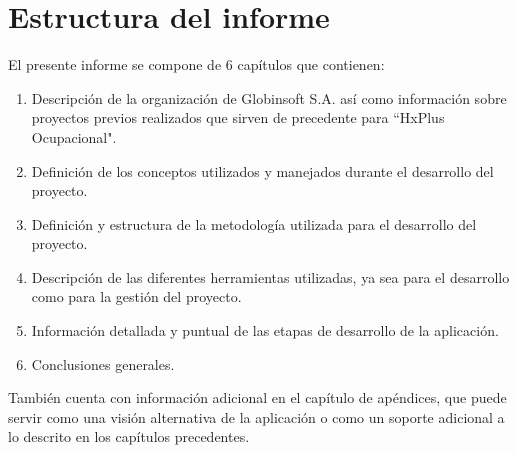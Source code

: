 \section*{Estructura del informe}

El presente informe se compone de 6 capítulos que contienen:

\begin{enumerate}
    \item Descripción de la organización de Globinsoft S.A. así como información sobre proyectos previos realizados que sirven de precedente para ``HxPlus Ocupacional".
    \item Definición de los conceptos utilizados y manejados durante el desarrollo del proyecto.
    \item Definición y estructura de la metodología utilizada para el desarrollo del proyecto.
    \item Descripción de las diferentes herramientas utilizadas, ya sea para el desarrollo como para la gestión del proyecto.
    \item Información detallada y puntual de las etapas de desarrollo de la aplicación.
    \item Conclusiones generales.
\end{enumerate}

También cuenta con información adicional en el capítulo de apéndices, que puede servir como una visión alternativa de la aplicación o como un soporte adicional a lo descrito en los capítulos precedentes.

\pagebreak